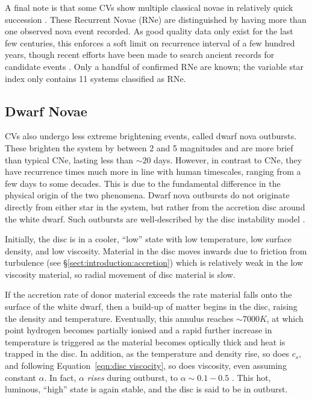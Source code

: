 A final note is that some CVs show multiple classical novae in relatively quick succession \citep{schaeffer2010}. These Recurrent Novae (RNe) are distinguished by having more than one observed nova event recorded. As good quality data only exist for the last few centuries, this enforces a soft limit on recurrence interval of a few hundred years, though recent efforts have been made to search ancient records for candidate events \citep{hoffmann2022}. Only a handful of confirmed RNe are known; the variable star index \citep{Watson2006} only contains 11 systems classified as RNe.

\subsection{Dwarf Novae}
\label{sect:introduction:dwarf novae}

CVs also undergo less extreme brightening events, called dwarf nova outbursts. These brighten the system by between 2 and 5 magnitudes \citep{warner1995} and are more brief than typical CNe, lasting less than $\sim 20$ days. However, in contrast to CNe, they have recurrence times much more in line with human timescales, ranging from a few days to some decades. This is due to the fundamental difference in the physical origin of the two phenomena.
Dwarf nova outbursts do not originate directly from either star in the system, but rather from the accretion disc around the white dwarf. Such outbursts are well-described by the disc instability model \citep{cannizzo1993, dubus2018}.

Initially, the disc is in a cooler, ``low'' state with low temperature, low surface density, and low viscosity. Material in the disc moves inwards due to friction from turbulence (see \S\ref{sect:introduction:accretion}) which is relatively weak in the low viscosity material, so radial movement of disc material is slow.

If the accretion rate of donor material exceeds the rate material falls onto the surface of the white dwarf, then a build-up of matter begins in the disc, raising the density and temperature. Eventually, this annulus reaches $\sim 7000K$, at which point hydrogen becomes partially ionised and a rapid further increase in temperature is triggered as the material becomes optically thick and heat is trapped in the disc. In addition, as the temperature and density rise, so does $c_s$, and following Equation~\ref{eqn:disc viscocity}, so does viscosity, even assuming constant $\alpha$. In fact, $\alpha$ {\it rises} during outburst, to $\alpha \sim 0.1 - 0.5$ \citep{hellier2001}. This hot, luminous, ``high'' state is again stable, and the disc is said to be in outburst. 


